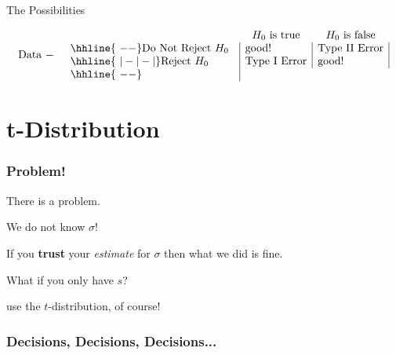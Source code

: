 \begin{frame}{The Possibilities}

  \begin{eqnarray*}
    \mathrm{Data~-} & &
      \begin{array}{l@{\hspace{1em}}|l|l|} 
        \multicolumn{1}{c}{~} & \multicolumn{1}{c}{H_0 \mathrm{~is~true}} & \multicolumn{1}{c}{H_0 \mathrm{~is~false}} \\ 
               \hhline{~--}
        \mathrm{Do~Not~Reject~}H_0 & \mathrm{good!} & \mathrm{Type~II~Error} \\ \hhline{~|-|-|}
        \mathrm{Reject~}H_0 & \mathrm{Type~I~Error} & \mathrm{good!} \\ \hhline{~--}
      \end{array}
  \end{eqnarray*}
  
\end{frame}


\section{t-Distribution}

\begin{frame}
  \frametitle{Problem!}

  There is a problem.

  {
    We do not know $\sigma$!
  }

  {
    If you \textbf{trust} your \textit{estimate} for $\sigma$ then
    what we did is fine.
  }

  {
    What if you only have $s$?
  }


  {
    use the $t$-distribution, of course!
  }


\end{frame}


\begin{frame}
  \frametitle{Decisions, Decisions, Decisions...}

\end{frame}


